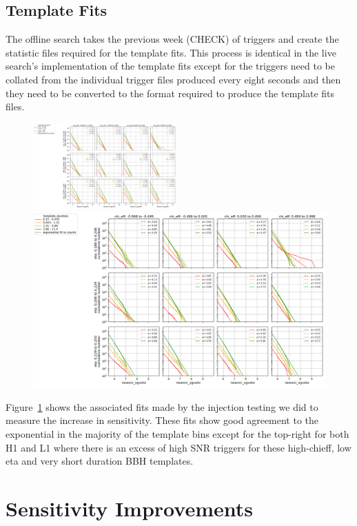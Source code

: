 \subsection{\label{live-template-fits}Template Fits}

The offline search takes the previous week (CHECK) of triggers and create the statistic files required for the template fits. This process is identical in the live search's implementation of the template fits except for the triggers need to be collated from the individual trigger files produced every eight seconds and then they need to be converted to the format required to produce the template fits files.
%
\begin{figure}
  \centering
  \begin{minipage}[t]{1.0\linewidth}
  \includegraphics[width=0.49\textwidth]{images/pycbclive/H1-template_fits.png}
  \hspace{0.01\linewidth}
  \includegraphics[width=0.49\linewidth]{images/pycbclive/L1-template_fits.png}
  \end{minipage}
  \caption{}
  \label{fig:pycbclive-fits}
\end{figure}
%
Figure~\ref{fig:pycbclive-fits} shows the associated fits made by the injection testing we did to measure the increase in sensitivity. These fits show good agreement to the exponential in the majority of the template bins except for the top-right for both H1 and L1 where there is an excess of high SNR triggers for these high-chieff, low eta and very short duration BBH templates.

\section{\label{sec:pcycblive-sensitivity-improvements}Sensitivity Improvements}

